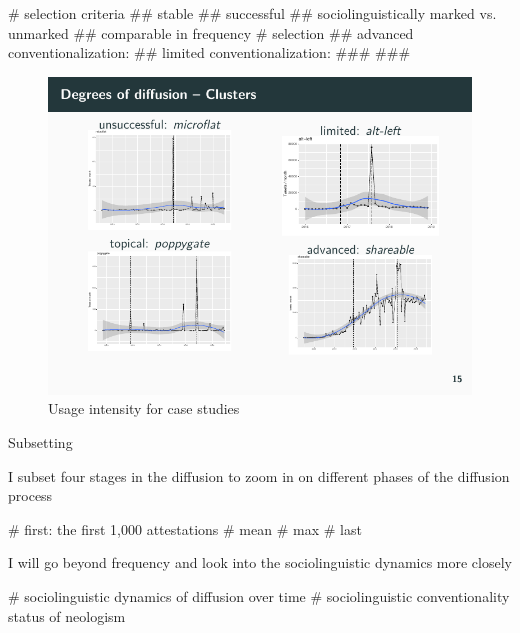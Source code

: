 \documentclass[
  a4paper,
  ]{scrartcl}
\begin{document}
      \begin{easylist}[itemize]
        # selection criteria
          ## stable
          ## successful
          ## sociolinguistically marked vs. unmarked
          ## comparable in frequency
        # selection
          ## advanced conventionalization: 
          ## limited conventionalization:
            ### 
            ### 
      \end{easylist}

      \begin{figure}[H]
        \centering
        \includegraphics[width=\linewidth, height=.8\textheight, keepaspectratio]{images/ui_cases.pdf}
        \caption{Usage intensity for case studies}
      \end{figure}

      Subsetting

        I subset four stages in the diffusion to zoom in on different phases of the diffusion process 

        \begin{easylist}[itemize]
          # first: the first 1,000 attestations
          # mean
          # max
          # last
        \end{easylist}

      I will go beyond frequency and look into the sociolinguistic dynamics more closely

      \begin{easylist}[itemize]
        # sociolinguistic dynamics of diffusion over time
        # sociolinguistic conventionality status of neologism
      \end{easylist}
\end{document}
